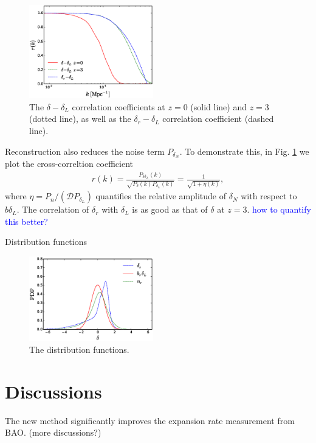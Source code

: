 \documentclass[aps,prd,twocolumn,showpacs,superscriptaddress,groupedaddress,nofootinbib]{revtex4}  %
\newcommand{\tcb}{\textcolor{blue}}
\newcommand{\bea}{\begin{eqnarray}}
\newcommand{\eea}{\end{eqnarray}}
\begin{document}
\begin{figure}[tbp]
\begin{center}
\includegraphics[width=0.48\textwidth]{f7x.eps}
\end{center}
\vspace{-0.7cm}
\caption{The $\delta-\delta_L$ correlation coefficients at $z=0$ (solid
line) and $z=3$ (dotted line), as well as the $\delta_r-\delta_L$ 
correlation coefficient (dashed line).}
\label{fig:xcc}
\end{figure}

Reconstruction also reduces the noise term $P_{\delta_N}$. To demonstrate this,
in Fig. \ref{fig:xcc} we plot the  cross-correltion coefficient 
\bea
r(k)=\frac{P_{\delta\delta_L}(k)}
{\sqrt{P_{\delta}(k)P_{\delta_L}(k)}}
=\frac{1}{\sqrt{1+\eta(k)}},
\eea
where $\eta=P_n/(\mathcal{D}P_{\delta_L})$ quantifies the relative amplitude
of $\delta_N$ with respect to $b\delta_L$. The correlation of $\delta_r$ with
$\delta_L$ is as good as that of $\delta$ at $z=3$.
\tcb{how to quantify this better?}

Distribution functions 
\begin{figure}[tbp]
\begin{center}
\includegraphics[width=0.48\textwidth]{f8x.eps}
\end{center}
\vspace{-0.7cm}
\caption{The distribution functions.}
\label{fig:pdf}
\end{figure}




\section{ Discussions}
The new method significantly
improves the expansion rate measurement from BAO. (more discussions?) 
\end{document}
